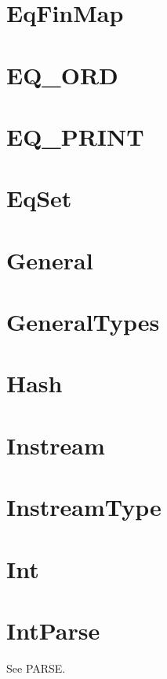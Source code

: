 \newpage
\section{EqFinMap}


\newpage
\section{EQ\_ORD}


\newpage
\section{EQ\_PRINT}


\newpage
\section{EqSet}


\newpage
\section{General}


\newpage
\section{GeneralTypes}


\newpage
\section{Hash}


\newpage
\section{Instream}


\newpage
\section{InstreamType}


\newpage
\section{Int}


\newpage
\section{IntParse}
See PARSE.

